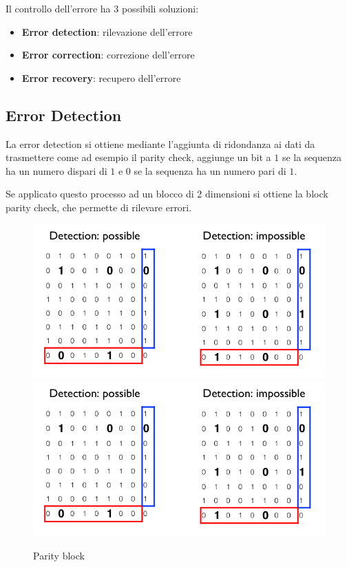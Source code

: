Il controllo dell'errore ha 3 possibili soluzioni:
\begin{itemize}
	\item \textbf{Error detection}: rilevazione dell'errore
	\item \textbf{Error correction}: correzione dell'errore
	\item \textbf{Error recovery}: recupero dell'errore
\end{itemize}
\subsection{Error Detection}


La error detection si ottiene mediante l'aggiunta di ridondanza ai dati da trasmettere come ad esempio il parity check, aggiunge un bit a $1$ se la sequenza ha un numero dispari di $1$ e $0$ se la sequenza ha un numero pari di $1$.


Se applicato questo processo ad un blocco di 2 dimensioni si ottiene la block parity check, che permette di rilevare errori.

\begin{figure}[!ht]
  \begin{adjustbox}{width=0.5\columnwidth, center}
    \includegraphics{images/parity_block.png}
    \includegraphics{./images/parity_block.png}
  \end{adjustbox}
    \caption{Parity block}
    \label{fig:parity_block}
\end{figure}


